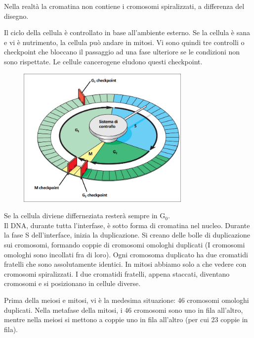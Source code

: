 \documentclass[a4paper]{article}
\begin{document}
Nella realtà la cromatina non contiene i cromosomi spiralizzati, a differenza del disegno.

Il ciclo della cellula è controllato in base all'ambiente esterno.
Se la cellula è sana e vi è nutrimento, la cellula può andare in mitosi.
Vi sono quindi tre controlli o checkpoint che bloccano il passaggio ad una fase ulteriore
se le condizioni non sono rispettate.
Le cellule cancerogene eludono questi checkpoint.

\begin{center}
\begin{figure}[ht]
    \centering
    \includegraphics[width=0.75\textwidth]{./ciclo_cellulare3}
\end{figure}
\end{center}

Se la cellula diviene differneziata resterà sempre in G\({}_0\).
\\
Il DNA, durante tutta l'interfase, è sotto forma di cromatina nel nucleo.
Durante la fase S dell'interface, inizia la duplicazione.
Si creano delle bolle di duplicazione sui cromosomi, formando
coppie di cromosomi omologhi duplicati (I cromosomi omologhi sono incollati fra di loro).
Ogni cromosoma duplicato ha due cromatidi fratelli che sono assolutamente identici.
In mitosi abbiamo solo a che vedere con cromosomi spiralizzati.
I due cromatidi fratelli, appena staccati, diventano cromosomi e si posizionano in cellule diverse.

Prima della meiosi e mitosi, vi è la medesima situazione: 46 cromosomi omologhi duplicati.
Nella metafase della mitosi, i 46 cromosomi sono uno in fila all'altro,
mentre nella meiosi si mettono a coppie uno in fila all'altro (per cui 23 coppie in fila).

\end{document}
